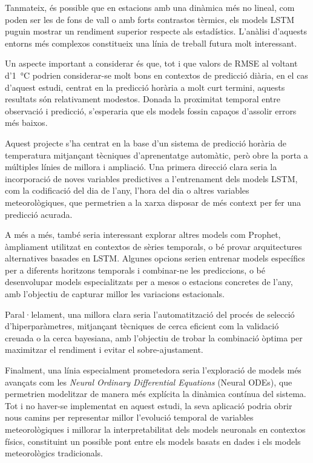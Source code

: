 \documentclass[../main.tex]{subfiles}
\begin{document}
Tanmateix, és possible que en estacions amb una dinàmica més no lineal, com poden ser les de fons de vall o amb forts contrastos tèrmics, els models LSTM puguin mostrar un rendiment superior respecte als estadístics. L’anàlisi d’aquests entorns més complexos constitueix una línia de treball futura molt interessant.

Un aspecte important a considerar és que, tot i que valors de RMSE al voltant d’1~\si{\celsius} podrien considerar-se molt bons en contextos de predicció diària, en el cas d’aquest estudi, centrat en la predicció horària a molt curt termini, aquests resultats són relativament modestos. Donada la proximitat temporal entre observació i predicció, s’esperaria que els models fossin capaços d’assolir errors més baixos.

Aquest projecte s'ha centrat en la base d’un sistema de predicció horària de temperatura mitjançant tècniques d’aprenentatge automàtic, però obre la porta a múltiples línies de millora i ampliació. Una primera direcció clara seria la incorporació de noves variables predictives a l'entrenament dels models LSTM, com la codificació del dia de l’any, l’hora del dia o altres variables meteorològiques, que permetrien a la xarxa disposar de més context per fer una predicció acurada.

A més a més, també seria interessant explorar altres models com Prophet, àmpliament utilitzat en contextos de sèries temporals, o bé provar arquitectures alternatives basades en LSTM. Algunes opcions serien entrenar models específics per a diferents horitzons temporals i combinar-ne les prediccions, o bé desenvolupar models especialitzats per a mesos o estacions concretes de l’any, amb l’objectiu de capturar millor les variacions estacionals.

Paral·lelament, una millora clara seria l’automatització del procés de selecció d’hiperparàmetres, mitjançant tècniques de cerca eficient com la validació creuada o la cerca bayesiana, amb l’objectiu de trobar la combinació òptima per maximitzar el rendiment i evitar el sobre-ajustament.

Finalment, una línia especialment prometedora seria l’exploració de models més avançats com les \textit{Neural Ordinary Differential Equations} (Neural ODEs), que permetrien modelitzar de manera més explícita la dinàmica contínua del sistema. Tot i no haver-se implementat en aquest estudi, la seva aplicació podria obrir nous camins per representar millor l’evolució temporal de variables meteorològiques i millorar la interpretabilitat dels models neuronals en contextos físics, constituint un possible pont entre els models basats en dades i els models meteorològics tradicionals.


\end{document}
